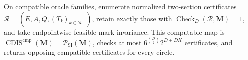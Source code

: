 On compatible oracle families, enumerate normalized two-section certificates \(\mathcal R=(E,A,Q,(T_k)_{k\in\mathcal K_+})\), retain exactly those with \(\operatorname{Check}_{D}(\mathcal R,\mathbf M)=1\), and take endpointwise feasible-mark invariance.  This computable map is \(\operatorname{CDIS}^{\mathrm{cmp}}(\mathbf M)=\mathcal P_{\mathrm{SI}}(\mathbf M)\), checks at most \(6^{\binom D2}2^{D+DK}\) certificates, and returns opposing compatible certificates for every circle.